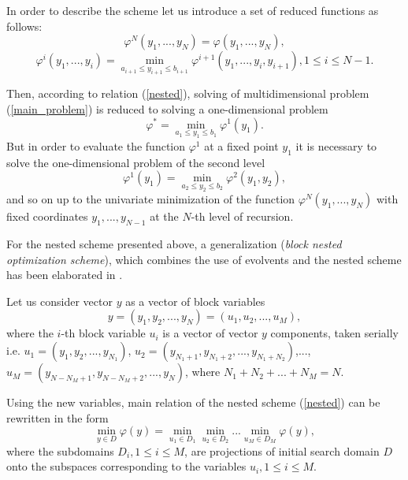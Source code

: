 \documentclass[runningheads]{llncs}
\begin{document}
In order to describe the scheme let us introduce a set of reduced functions 
as follows:
\begin{equation}\label{nested_N}
\varphi^N(y_1,...,y_N) = \varphi(y_1,...,y_N),
\end{equation}
\begin{equation}\label{nested_i}
\varphi^i(y_1,...,y_i) = \min_{a_{i+1}\leq y_{i+1}\leq b_{i+1}} \varphi^{i+1}(
y_1,...,y_i,y_{i+1}), 1\leq i\leq N-1.
\end{equation}

Then, according to relation (\ref{nested}), solving of multidimensional 
problem (\ref{main_problem}) is reduced to solving a one-dimensional problem 
\begin{equation}\label{nested_1}
\varphi^* = \min_{a_1\leq y_1\leq b_1}\varphi^1(y_1).
\end{equation}
But in order to evaluate the function $\varphi^1$ at a fixed point $y_1$ it 
is necessary to solve the one-dimensional problem of the second level
\begin{equation}
\varphi^1(y_1) = \min_{a_2\leq y_2\leq b_2}\varphi^2(y_1,y_2),
\end{equation}
and so on up to the univariate minimization of the function $\varphi^N(y_1
,...,y_N)$ with fixed coordinates $y_1,...,y_{N-1}$ at the $N$-th level of 
recursion.

For the nested scheme presented above, a generalization (\textit{block nested 
optimization scheme}), which combines the use of evolvents and the nested 
scheme has been elaborated in \cite{Barkalov2016}.

Let us consider vector $y$ as a vector of block variables
\begin{equation}
y=(y_1,y_2,...,y_N)=(u_1,u_2,...,u_M),
\end{equation}
where the $i$-th block variable $u_i$ is a vector of vector $y$ components, 
taken serially i.e. $u_1=(y_1,y_2,...,y_{N_1})$, $u_2=(y_{N_1+1},y_{N_1+2}
,...,y_{N_1+N_2})$,..., $u_M=(y_{N-N_M+1},y_{N-N_M+2},...,y_{N})$, where $N_1+
N_2+...+N_M=N$.

Using the new variables, main relation of the nested scheme (\ref{nested}) 
can be rewritten in the form 
\begin{equation}\label{block_nested}
\min_{y \in D}\varphi(y) = \min_{u_1\in D_1}\min_{u_2\in D_2}...\min_{u_M \in 
D_M}\varphi(y),
\end{equation}
where the subdomains $D_i, 1 \leq i \leq M$, are projections of initial 
search domain $D$ onto the subspaces corresponding to the variables $u_i, 1 
\leq i \leq M$.
\end{document}
